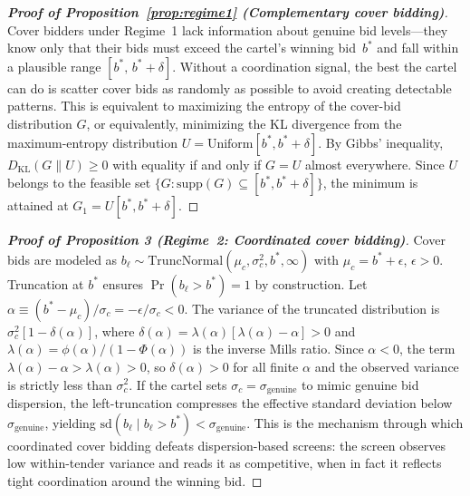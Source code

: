 \begin{proof}[\textbf{Proof of Proposition~\ref{prop:regime1} (Complementary cover bidding)}]
Cover bidders under Regime~1 lack information about genuine bid
levels---they know only that their bids must exceed the cartel's winning
bid~$b^*$ and fall within a plausible range $[b^*,\, b^* + \delta]$.
Without a coordination signal, the best the cartel can do is scatter
cover bids as randomly as possible to avoid creating detectable patterns. This is equivalent to maximizing the entropy of
the cover-bid distribution $G$, or equivalently, minimizing the KL
divergence from the maximum-entropy distribution $U =
\text{Uniform}[b^*, b^* + \delta]$. By Gibbs' inequality,
$D_{\text{KL}}(G \| U) \geq 0$ with equality if and only if $G = U$
almost everywhere. Since $U$ belongs to the feasible set
$\{G : \text{supp}(G) \subseteq [b^*, b^* + \delta]\}$,
the minimum is attained at $G_1 = U[b^*, b^* + \delta]$.
\end{proof}

\begin{proof}[\textbf{Proof of Proposition 3 (Regime~2: Coordinated cover bidding)}]
Cover bids are modeled as $b_\ell \sim
\text{TruncNormal}(\mu_c, \sigma_c^2, b^*, \infty)$ with
$\mu_c = b^* + \epsilon$, $\epsilon > 0$. Truncation at $b^*$
ensures $\Pr(b_\ell > b^*) = 1$ by construction. Let
$\alpha \equiv (b^* - \mu_c)/\sigma_c = -\epsilon/\sigma_c < 0$.
The variance of the truncated distribution is
$\sigma_c^2[1 - \delta(\alpha)]$, where
$\delta(\alpha) = \lambda(\alpha)[\lambda(\alpha) - \alpha] > 0$
and $\lambda(\alpha) = \phi(\alpha)/(1 - \Phi(\alpha))$ is the
inverse Mills ratio. Since $\alpha < 0$, the term
$\lambda(\alpha) - \alpha > \lambda(\alpha) > 0$, so
$\delta(\alpha) > 0$ for all finite $\alpha$ and the observed
variance is strictly less than $\sigma_c^2$.
If the cartel sets $\sigma_c = \sigma_{\text{genuine}}$ to mimic
genuine bid dispersion, the left-truncation compresses the effective
standard deviation below $\sigma_{\text{genuine}}$, yielding
$\text{sd}(b_\ell \mid b_\ell > b^*) < \sigma_{\text{genuine}}$.
This is the mechanism through which coordinated cover bidding defeats
dispersion-based screens: the screen observes low within-tender
variance and reads it as competitive, when in fact it reflects
tight coordination around the winning bid.
\end{proof}

